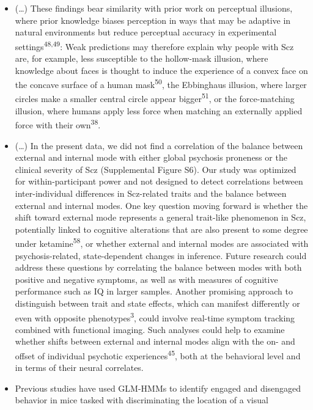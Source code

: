 \documentclass[
]{article}
\begin{document}
\begin{itemize}
\item
  (\ldots) These findings bear similarity with prior work on perceptual
  illusions, where prior knowledge biases perception in ways that may be
  adaptive in natural environments but reduce perceptual accuracy in
  experimental settings\textsuperscript{48,49}: Weak predictions may
  therefore explain why people with Scz are, for example, less
  susceptible to the hollow-mask illusion, where knowledge about faces
  is thought to induce the experience of a convex face on the concave
  surface of a human mask\textsuperscript{50}, the Ebbinghaus illusion,
  where larger circles make a smaller central circle appear
  bigger\textsuperscript{51}, or the force-matching illusion, where
  humans apply less force when matching an externally applied force with
  their own\textsuperscript{38}.
\item
  (\ldots) In the present data, we did not find a correlation of the
  balance between external and internal mode with either global
  psychosis proneness or the clinical severity of Scz (Supplemental
  Figure S6). Our study was optimized for within-participant power and
  not designed to detect correlations between inter-individual
  differences in Scz-related traits and the balance between external and
  internal modes. One key question moving forward is whether the shift
  toward external mode represents a general trait-like phenomenon in
  Scz, potentially linked to cognitive alterations that are also present
  to some degree under ketamine\textsuperscript{58}, or whether external
  and internal modes are associated with psychosis-related,
  state-dependent changes in inference. Future research could address
  these questions by correlating the balance between modes with both
  positive and negative symptoms, as well as with measures of cognitive
  performance such as IQ in larger samples. Another promising approach
  to distinguish between trait and state effects, which can manifest
  differently or even with opposite phenotypes\textsuperscript{3}, could
  involve real-time symptom tracking combined with functional imaging.
  Such analyses could help to examine whether shifts between external
  and internal modes align with the on- and offset of individual
  psychotic experiences\textsuperscript{45}, both at the behavioral
  level and in terms of their neural correlates.
\item
  Previous studies have used GLM-HMMs to identify engaged and disengaged
  behavior in mice tasked with discriminating the location of a visual

\end{itemize}
\end{document}
